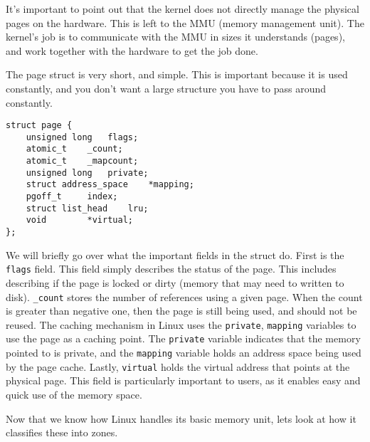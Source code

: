 \documentclass[10pt,letterpaper,onecolumn,draftclsnofoot]{IEEEtran}
\begin{document}
It's important to point out that the kernel does not directly manage the
physical pages on the hardware. This is left to the MMU (memory
management unit). The kernel's job is to communicate with the MMU in
sizes it understands (pages), and work together with the hardware to
get the job done.

The page struct is very short, and simple. This is important because it
is used constantly, and you don't want a large structure you have to
pass around constantly. \cite{robertlove2010}

\begin{lstlisting}[caption=The Linux page struct - the primary descriptor and basic unit of memory]
struct page {
	unsigned long	flags;
	atomic_t	_count;
	atomic_t	_mapcount;
	unsigned long	private;
	struct address_space	*mapping;
	pgoff_t		index;
	struct list_head	lru;
	void 		*virtual;
};
\end{lstlisting}

We will briefly go over what the important fields in the struct do.
First is the \texttt{flags} field. This field simply describes the
status of the page. This includes describing if the page is locked or
dirty (memory that may need to written to disk). \texttt{\_count}
stores the number of references using a given page. When the count is
greater than negative one, then the page is still being used, and should
not be reused. The caching mechanism in Linux uses the \texttt{private},
\texttt{mapping} variables to use the page as a caching point. The
\texttt{private} variable indicates that the memory pointed to is private,
and the \texttt{mapping} variable holds an address space being used by
the page cache. Lastly, \texttt{virtual} holds the virtual address that
points at the physical page. This field is particularly important to
users, as it enables easy and quick use of the memory space.

Now that we know how Linux handles its basic memory unit, lets look at
how it classifies these into zones.
\end{document}
